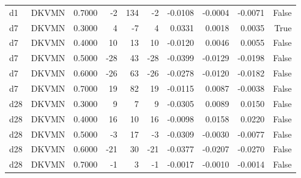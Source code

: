 \begin{tabular}{llrrrrrrrr}
d1 & DKVMN & 0.7000 & -2 & 134 & -2 & -0.0108 & -0.0004 & -0.0071 & False \\
d7 & DKVMN & 0.3000 & 4 & -7 & 4 & 0.0331 & 0.0018 & 0.0035 & True \\
d7 & DKVMN & 0.4000 & 10 & 13 & 10 & -0.0120 & 0.0046 & 0.0055 & False \\
d7 & DKVMN & 0.5000 & -28 & 43 & -28 & -0.0399 & -0.0129 & -0.0198 & False \\
d7 & DKVMN & 0.6000 & -26 & 63 & -26 & -0.0278 & -0.0120 & -0.0182 & False \\
d7 & DKVMN & 0.7000 & 19 & 82 & 19 & -0.0115 & 0.0087 & -0.0038 & False \\
d28 & DKVMN & 0.3000 & 9 & 7 & 9 & -0.0305 & 0.0089 & 0.0150 & False \\
d28 & DKVMN & 0.4000 & 16 & 10 & 16 & -0.0098 & 0.0158 & 0.0220 & False \\
d28 & DKVMN & 0.5000 & -3 & 17 & -3 & -0.0309 & -0.0030 & -0.0077 & False \\
d28 & DKVMN & 0.6000 & -21 & 30 & -21 & -0.0377 & -0.0207 & -0.0270 & False \\
d28 & DKVMN & 0.7000 & -1 & 3 & -1 & -0.0017 & -0.0010 & -0.0014 & False \\
\bottomrule
\end{tabular}
